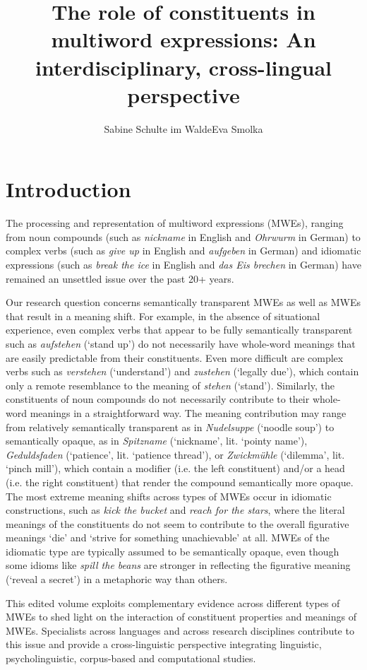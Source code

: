 \documentclass[output=paper]{langsci/langscibook}
\title{The role of constituents in multiword expressions: An interdisciplinary, cross-lingual perspective}
\author{Sabine Schulte im Walde\affiliation{Institut für Maschinelle Sprachverarbeitung, Universität Stuttgart}\lastand  Eva Smolka\affiliation{Fachbereich Linguistik, Universität Konstanz}}
\begin{document}
\section{Introduction}

The processing and representation of multiword expressions (MWEs),
ranging from noun compounds (such as \textit{nickname} in English and
\textit{Ohrwurm} in German) to complex verbs (such as \textit{give up}
in English and \textit{aufgeben} in German) and idiomatic expressions
(such as \textit{break the ice} in English and \textit{das Eis
  brechen} in German) have remained an unsettled issue over the past
20+ years.

Our research question concerns semantically transparent MWEs as well as MWEs that result in a meaning
shift. For example, in the absence of situational experience, even
complex verbs that appear to be fully semantically transparent such as
\textit{aufstehen} (`stand up') do not necessarily have whole-word
meanings that are easily predictable from their constituents. Even
more difficult are complex verbs such as \textit{verstehen}
(`understand') and \textit{zustehen} (`legally due'), which contain
only a remote resemblance to the meaning of \textit{stehen}
(`stand'). Similarly, the constituents of noun compounds do not
necessarily contribute to their whole-word meanings in a
straightforward way. The meaning contribution may range from
relatively semantically transparent as in \textit{Nudelsuppe}
(`noodle soup') to semantically opaque, as in \textit{Spitzname}
(`nickname', lit. `pointy name'), \textit{Geduldsfaden} (`patience', lit. `patience thread'), or  \textit{Zwickmühle} (`dilemma',
lit. `pinch mill'), which contain a modifier (i.e. the left
constituent) and/or a head (i.e. the right constituent) that render the
compound semantically more opaque.  The most extreme meaning shifts
across types of MWEs occur in idiomatic constructions, such as
\textit{kick the bucket} and \textit{reach for the stars}, where the
literal meanings of the constituents do not seem to contribute to the
overall figurative meanings `die' and `strive for something
unachievable' at all. MWEs of the idiomatic type are typically assumed
to be semantically opaque, even though some idioms like \textit{spill
  the beans} are stronger in reflecting the figurative meaning
(`reveal a secret') in a metaphoric way than others.

This edited volume exploits complementary evidence across different
types of MWEs to shed light on the interaction of constituent
properties and meanings of MWEs. Specialists across languages and
across research disciplines contribute to this issue and provide a
cross-linguistic perspective integrating linguistic, psycholinguistic,
corpus-based and computational studies.
\end{document}
